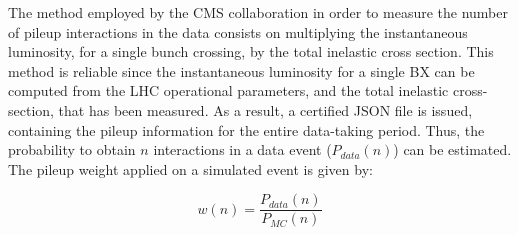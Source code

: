 \noindent The method employed by the CMS collaboration in order to measure 
the number of pileup interactions in the data consists on multiplying 
the instantaneous luminosity, for a single bunch crossing,
by the total inelastic cross section. This method is reliable
since the instantaneous luminosity for a single BX can be computed
from the LHC operational parameters, and the total inelastic 
cross-section, that has been measured. As a result, a certified JSON file 
is issued, containing the pileup information for the 
entire data-taking period. Thus, the probability to 
obtain $n$ interactions in a data event ($P_{data}(n)$) can be estimated. \\

\noindent The pileup weight applied on a simulated event is given by:

\begin{equation}
w(n) = \frac{P_{data}(n)}{P_{MC}(n)}
\end{equation}

